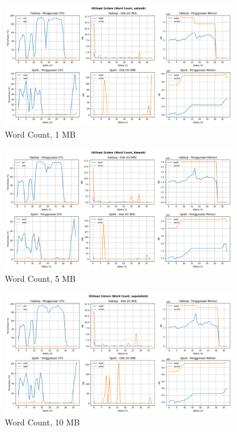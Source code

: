 \begin{figure}[h]
    \centering
    \includegraphics[width=0.9\textwidth]{figures/ch04/5-util-sistem-wordcount-satumb.png}
    \caption*{Word Count, 1 MB}
\end{figure}

\begin{figure}[h]
    \centering
    \includegraphics[width=0.9\textwidth]{figures/ch04/5-util-sistem-wordcount-limamb.png}
    \caption*{Word Count, 5 MB}
\end{figure}

\begin{figure}[h]
    \centering
    \includegraphics[width=0.9\textwidth]{figures/ch04/5-util-sistem-wordcount-sepuluhmb.png}
    \caption*{Word Count, 10 MB}
\end{figure}

